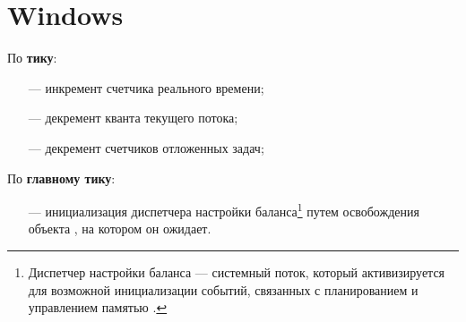 
\newpage

\section{Windows}

По \textbf{тику}:

\begin{itemize}
    \item[---] инкремент счетчика реального времени;
    \item[---] декремент кванта текущего потока;
    \item[---] декремент счетчиков отложенных задач;
\end{itemize}

По \textbf{главному тику}:

\begin{itemize}
    \item[---] инициализация диспетчера настройки баланса\footnote{Диспетчер настройки баланса --- системный поток, который активизируется для возможной инициализации событий, связанных с планированием и управлением памятью \cite{win3}.} путем освобождения объекта \guillemotright, на котором он ожидает. 
\end{itemize}

